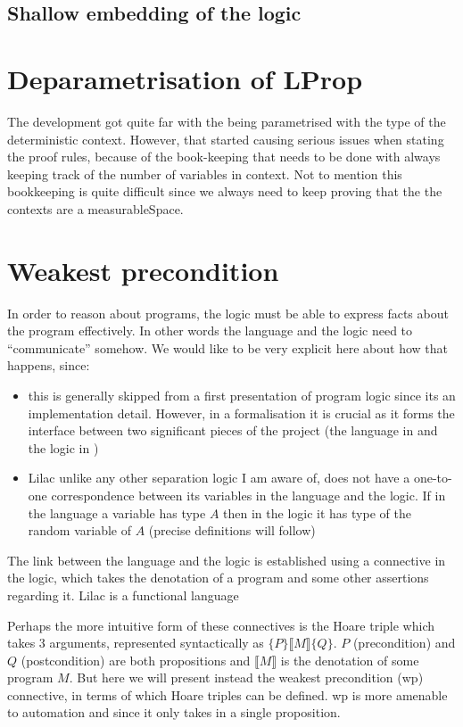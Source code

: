 \subsection{Shallow embedding of the logic}


\section{Deparametrisation of LProp}

The development got quite far with the  being parametrised with the type of the deterministic context. However, that started causing
serious issues when stating the proof rules, because of the book-keeping that needs to be done with always keeping track of the number of variables
in context. Not to mention this bookkeeping is quite difficult since we always need to keep proving that the the contexts are a measurableSpace.



\section{Weakest precondition}
In order to reason about programs, the logic must be able to express facts about the program effectively. In other words the language and the logic need to 
``communicate'' somehow. We would like to be very explicit here about how that happens, since:
\begin{itemize}
\item this is generally skipped from a first presentation of program logic since its an implementation
detail. However, in a formalisation it is crucial as it forms the interface between two significant pieces of the project (the language in  and the logic in )
\item Lilac unlike any other separation logic I am aware of, does not have a one-to-one correspondence between its variables in the language and the logic.
If in the language a variable has type $A$ then in the logic it has type of the random variable of $A$ (precise definitions will follow)
\end{itemize}

The link between the language and the logic is established using a connective in the logic, which takes the denotation of a program and some
other assertions regarding it. Lilac is a functional language 

Perhaps the more intuitive form of these connectives is the Hoare triple which takes 3 arguments, represented syntactically as $\{ P \} \llbracket M \rrbracket \{ Q \}$.
$P$ (precondition) and $Q$ (postcondition) are both propositions and $\llbracket M \rrbracket$ is the denotation of some program $M$. But here
we will present instead the weakest precondition (wp) connective, in terms of which Hoare triples can be defined. wp is more amenable to automation and since it only takes in a single proposition.

